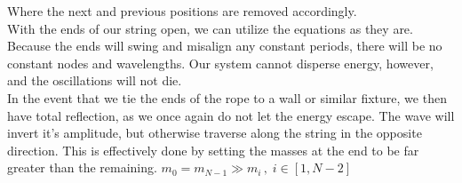 \documentclass[12pt]{article}
\begin{document}
Where the next and previous positions are removed accordingly. \\
	With the ends of our string open, we can utilize the equations as they are. Because the ends will swing and misalign any constant periods, there will be no constant nodes and wavelengths. Our system cannot disperse energy, however, and the oscillations will not die. \\
	In the event that we tie the ends of the rope to a wall or similar fixture, we then have total reflection, as we once again do not let the energy escape. The wave will invert it's amplitude, but otherwise traverse along the string in the opposite direction. This is effectively done by setting the masses at the end to be far greater than the remaining. $m_0 = m_{N-1} \gg m_i \,,\; i \in [1, N-2]$

\newpage
\end{document}
